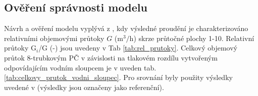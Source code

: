 \subsection{Ověření správnosti modelu}
Návrh a ověření modelu vyplývá z \cite{fejt}, kdy výsledné proudění je charakterizováno relativními objemovými průtoky $ G $ (m$ ^3/ $h) skrze průtočné plochy 1-10. Relativní průtoky G$ _i $/G (-) jsou uvedeny v Tab \ref{tab:rel_prutoky}. Celkový objemový průtok 8-trubkovým PČ v závislosti na tlakovém rozdílu vytvořeným odpovídajícím vodním sloupcem je v uveden tab. \ref{tab:celkovy_prutok_vodni_sloupec}. Pro srovnání byly použity výsledky uvedené v \cite{sedlbauer2019} (výsledky jsou označeny jako referenční). 
